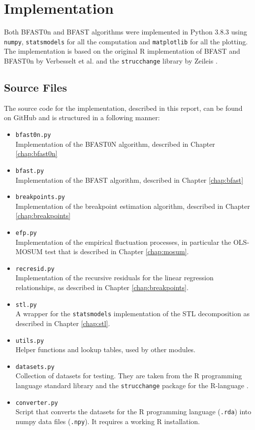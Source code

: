 \documentclass[main.tex]{subfiles}
\begin{document}
\chapter{Implementation}
\label{chap:implementation}
Both BFAST0n and BFAST algorithms were implemented in Python 3.8.3 using
\texttt{numpy}, \texttt{statsmodels}\cite{statsmodels} for all the computation
and \texttt{matplotlib} for all the plotting. The implementation is based on the
original R implementation of BFAST and BFAST0n by Verbesselt et al.
\cite{bfast-github} and the \texttt{strucchange} library by Zeileis
\cite{strucchange_code}.

\section{Source Files}
\label{sec:source_files}
The source code for the implementation, described in this report, can be found
on GitHub \cite{my-github} and is structured in a following manner:
\begin{itemize}
\item \texttt{bfast0n.py}\\
  Implementation of the BFAST0N algorithm, described in Chapter \ref{chap:bfast0n}
\item \texttt{bfast.py}\\
  Implementation of the BFAST algorithm, described in Chapter \ref{chap:bfast}
\item \texttt{breakpoints.py}\\
  Implementation of the breakpoint estimation algorithm, described in Chapter \ref{chap:breakpoints}
\item \texttt{efp.py}\\
  Implementation of the empirical fluctuation processes, in particular the OLS-MOSUM test that is
  described in Chapter \ref{chap:mosum}.
\item \texttt{recresid.py}\\
  Implementation of the recursive residuals for the linear regression relationships,
  as described in Chapter \ref{chap:breakpoints}.
\item \texttt{stl.py} \\
  A wrapper for the \texttt{statsmodels} \cite{statsmodels} implementation of the STL decomposition as
  described in Chapter \ref{chap:stl}.
\item \texttt{utils.py} \\
  Helper functions and lookup tables, used by other modules. 
\item \texttt{datasets.py}\\
  Collection of datasets for testing. They are taken from the R programming language standard library
  \cite{r-datasets} and
  the \texttt{strucchange} package for the R-language \cite{strucchange_code}.
\item \texttt{converter.py}\\
  Script that converts the datasets for the R programming language (\texttt{.rda}) into numpy
  data files (\texttt{.npy}). It requires a working R installation.
\end{itemize}
\end{document}
